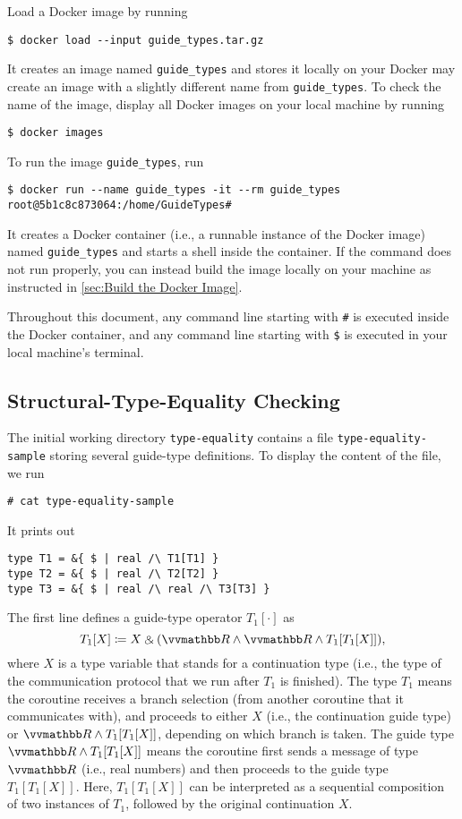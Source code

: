 Load a Docker image by running
\begin{verbatim}
$ docker load --input guide_types.tar.gz
\end{verbatim}
%
It creates an image named \texttt{guide\_types} and stores it locally on your
%
Docker may create an image with a slightly different name from
\texttt{guide\_types}.
%
To check the name of the image, display all Docker images on your local machine
by running
\begin{verbatim}
$ docker images
\end{verbatim}

To run the image \texttt{guide\_types}, run
\begin{verbatim}
$ docker run --name guide_types -it --rm guide_types
root@5b1c8c873064:/home/GuideTypes#
\end{verbatim}
%
It creates a Docker container (i.e., a runnable instance of the Docker image)
named \texttt{guide\_types} and starts a shell inside the container.
%
If the command does not run properly, you can instead build the image locally on
your machine as instructed in \cref{sec:Build the Docker Image}.

Throughout this document, any command line starting with \texttt{\#} is executed
inside the Docker container, and any command line starting with \texttt{\$} is
executed in your local machine's terminal.

\subsection{Structural-Type-Equality Checking}

The initial working directory \texttt{type-equality} contains a file
\texttt{type-equality-sample} storing several guide-type definitions.
%
To display the content of the file, we run
\begin{verbatim}
# cat type-equality-sample
\end{verbatim}
%
It prints out
\begin{verbatim}
type T1 = &{ $ | real /\ T1[T1] }
type T2 = &{ $ | real /\ T2[T2] }
type T3 = &{ $ | real /\ real /\ T3[T3] }
\end{verbatim}
%
The first line defines a guide-type operator $T_1 [\cdot]$ as
\begin{equation*}
  T_1 [X] \coloneq X \echoice (\treal \land \treal \land T_1 [T_1[X]]),
\end{equation*}
where $X$ is a type variable that stands for a continuation type (i.e., the type
of the communication protocol that we run after $T_1$ is finished).
%
The type $T_1$ means the coroutine receives a branch selection (from another
coroutine that it communicates with), and proceeds to either $X$ (i.e., the
continuation guide type) or $\treal \land T_1 [T_1[X]]$, depending on which
branch is taken.
%
The guide type $\treal \land T_1 [T_1[X]]$ means the coroutine first sends a
message of type $\treal$ (i.e., real numbers) and then proceeds to the guide type
$T_1 [T_1 [X]]$.
%
Here, $T_1 [T_1 [X]]$ can be interpreted as a sequential composition of two
instances of $T_1$, followed by the original continuation $X$.


